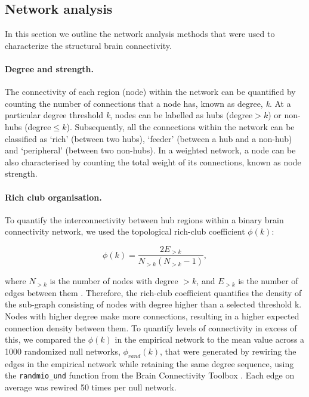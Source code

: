 \subsection{Network analysis}
In this section we outline the network analysis methods that were used to characterize the structural brain connectivity.

\paragraph*{Degree and strength.}

The connectivity of each region (node) within the network can be quantified by counting the number of connections that a node has, known as degree, \textit{k}. At a particular degree threshold \textit{k}, nodes can be labelled as hubs (degree$>k$) or non-hubs (degree$\leq k$). Subsequently, all the connections within the network can be classified as `rich' (between two hubs), `feeder' (between a hub and a non-hub) and `peripheral' (between two non-hubs). In a weighted network, a node can be also characterised by counting the total weight of its connections, known as node strength.

\paragraph*{Rich club organisation.}

To quantify the interconnectivity between hub regions within a binary brain connectivity network, we used the topological rich-club coefficient $\phi(k)$:

\begin{equation}
    \label{eqn:Ch5Eq1}
    \phi(k) = \frac{2E_{>k}}{N_{>k}(N_{>k}-1)},
\end{equation}

where $N_{>k}$ is the number of nodes with degree $>k$, and $E_{>k}$ is the number of edges between them \citep{Colizza2006}. Therefore, the rich-club coefficient quantifies the density of the sub-graph consisting of nodes with degree higher than a selected threshold k. Nodes with higher degree make more connections, resulting in a higher expected connection density between them. To quantify levels of connectivity in excess of this, we compared the $\phi(k)$ in the empirical network to the mean value across a 1000 randomized null networks, $\phi_{rand}(k)$, that were generated by rewiring the edges in the empirical network while retaining the same degree sequence, using the \texttt{randmio\_und} function from the Brain Connectivity Toolbox \citep{Rubinov2010}. Each edge on average was rewired 50 times per null network.

